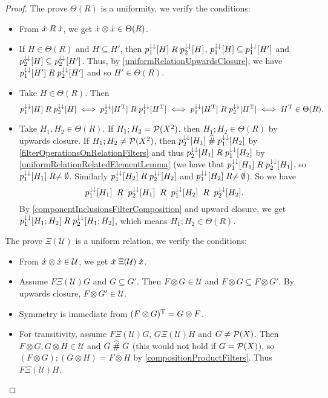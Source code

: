 \begin{proof}
The prove $\Theta(R)$ is a uniformity, we verify the conditions:
\begin{itemize}
\item From $\dot{x}\mathrel{R}\dot{x}$, we get $\dot{x}\otimes \dot{x}\in\Theta(R)$.
\item If $H\in\Theta(R)$ and $H\subseteq H'$, then $p_1^{\downarrow\downarrow}[H]\mathrel{R} p_2^{\downarrow\downarrow}[H]$, $p_1^{\downarrow\downarrow}[H]\subseteq p_1^{\downarrow\downarrow}[H']$ and $p_2^{\downarrow\downarrow}[H]\subseteq p_2^{\downarrow\downarrow}[H']$. Thus, by \ref{uniformRelationUpwardsClosure}, we have $p_1^{\downarrow\downarrow}[H']\mathrel{R} p_2^{\downarrow\downarrow}[H']$ and so $H'\in\Theta(R)$.
\item Take $H\in \Theta(R)$. Then
\[ p_1^{\downarrow\downarrow}[H]\mathrel{R} p_2^{\downarrow\downarrow}[H] \iff p_2^{\downarrow\downarrow}[H^{\mathrm{T}}]\mathrel{R} p_1^{\downarrow\downarrow}[H^{\mathrm{T}}] \iff p_1^{\downarrow\downarrow}[H^{\mathrm{T}}]\mathrel{R} p_2^{\downarrow\downarrow}[H^{\mathrm{T}}] \iff H^{\mathrm{T}}\in \Theta(R). \]
\item Take $H_1, H_2\in \Theta(R)$. If $H_1;H_2 = \operatorname{\mathcal{P}}(X^2)$, then $H_1;H_2\in\Theta(R)$ by upwards closure. If $H_1;H_2 \neq \operatorname{\mathcal{P}}(X^2)$, then $p_2^{\downarrow\downarrow}[H_1]\mathrel{\widehat{\#}} p_1^{\downarrow\downarrow}[H_2]$ by \ref{filterOperationsOnRelationFilters} and thus $p_2^{\downarrow\downarrow}[H_1]\mathrel{R} p_1^{\downarrow\downarrow}[H_2]$ by \ref{uniformRelationRelatedElementLemma} (we have that $p_1^{\downarrow\downarrow}[H_1]\mathrel{R}p_2^{\downarrow\downarrow}[H_1]$, so $p_1^{\downarrow\downarrow}[H_1]\mathrel{R}\neq \emptyset$. Similarly $p_1^{\downarrow\downarrow}[H_2]\mathrel{R}p_2^{\downarrow\downarrow}[H_2]$ and $p_1^{\downarrow\downarrow}[H_2]\mathrel{R}\neq \emptyset$). So we have
\[ p_1^{\downarrow\downarrow}[H_1]\;\mathrel{R} \;p_2^{\downarrow\downarrow}[H_1] \;\mathrel{R} \;p_1^{\downarrow\downarrow}[H_2]\; \mathrel{R} \;p_2^{\downarrow\downarrow}[H_2]. \]
By \ref{componentInclusionsFilterComposition} and upward closure, we get $p_1^{\downarrow\downarrow}[H_1;H_2]\mathrel{R}p_2^{\downarrow\downarrow}[H_1;H_2]$, which means $H_1;H_2\in \Theta(R)$.
\end{itemize}

The prove $\Xi(\mathcal{U})$ is a uniform relation, we verify the conditions:
\begin{itemize}
\item From $\dot{x}\otimes \dot{x}\in\mathcal{U}$, we get $\dot{x}\mathrel{\Xi(\mathcal{U})}\dot{x}$.
\item Assume $F\mathrel{\Xi(\mathcal{U})}G$ and $G\subseteq G'$. Then $F\otimes G\in \mathcal{U}$ and $F\otimes G\subseteq F\otimes G'$. By upwards closure, $F\otimes G'\in\mathcal{U}$.
\item Symmetry is immediate from $(F\otimes G)^{\mathrm{T}} = G\otimes F$.
\item For transitivity, assume $F\mathrel{\Xi(\mathcal{U})}G$, $G\mathrel{\Xi(\mathcal{U})}H$ and $G \neq \operatorname{\mathcal{P}}(X)$. Then $F\otimes G, G\otimes H\in\mathcal{U}$ and $G \mathrel{\widehat{\#}} G$ (this would not hold if $G = \operatorname{\mathcal{P}}(X)$), so $(F\otimes G);(G\otimes H) = F\otimes H$ by \ref{compositionProductFilters}. Thus $F\mathrel{\Xi(\mathcal{U})}H$.
\end{itemize}


\end{proof}
